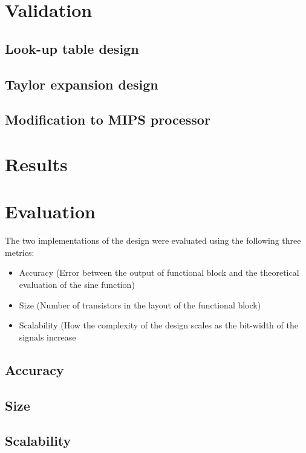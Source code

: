 \documentclass[10pt,journal]{IEEEtran}
\begin{document}
\section{Validation}

	\subsection{Look-up table design}
	\subsection{Taylor expansion design}
	\subsection{Modification to MIPS processor}

\section{Results}

\section{Evaluation}
The two implementations of the design were evaluated using the following three metrics:
\begin{itemize}
\item Accuracy (Error between the output of functional block and the theoretical evaluation of the sine function)
\item Size (Number of transistors in the layout of the functional block)
\item Scalability (How the complexity of the design scales as the bit-width of the signals increase
\end{itemize}

\subsection{Accuracy}
\subsection{Size}
\subsection{Scalability}
\end{document}
